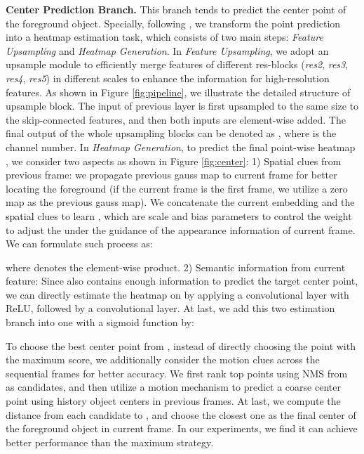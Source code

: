 \documentclass[letterpaper]{article} \usepackage{aaai20}  \usepackage{times}  \usepackage{helvet} \usepackage{courier}  \usepackage[hyphens]{url}  \usepackage{graphicx} \urlstyle{rm} \def\UrlFont{\rm}  \usepackage{graphicx}  \frenchspacing  \setlength{\pdfpagewidth}{8.5in}  \setlength{\pdfpageheight}{11in}  \usepackage{amssymb}
\newcommand{\ldz}[1]{\textcolor{black}{#1}}
\begin{document}
\noindent \textbf{Center Prediction Branch.}
This branch tends to predict the center point of the foreground object. Specially, following \cite{tompson2014joint}, we transform the point prediction into a heatmap  estimation task, which consists of two main steps: \textit{Feature Upsampling} and \textit{Heatmap Generation}.
In \textit{Feature Upsampling}, we adopt an upsample module to efficiently merge features of different res-blocks (\textit{res2}, \textit{res3}, \textit{res4}, \textit{res5}) in different scales to enhance the information for high-resolution features. 
As shown in Figure \ref{fig:pipeline}, we illustrate the detailed structure of upsample block. The input of previous layer is first upsampled to the same size to the skip-connected features, and then both inputs are element-wise added. The final output of the whole upsampling blocks can be denoted as , where  is the channel number. In \textit{Heatmap Generation}, to predict the final point-wise heatmap , we consider two aspects as shown in Figure \ref{fig:center}: 1) \ldz{Spatial} clues from previous frame: we propagate previous gauss map  to current frame for better locating the foreground
(if the current frame is the first frame, we utilize a zero map as the previous gauss map). We concatenate the current embedding  and the \ldz{spatial} clues  to learn , which are scale and bias parameters \ldz{\cite{yang2018efficient}} to control the weight to adjust the  under the guidance of the appearance information of current frame.
We can formulate such process as:



where  denotes the element-wise product. 2) Semantic information from current feature: Since  also contains enough information to predict the target center point, we can directly estimate the heatmap  on  by applying a  convolutional layer with ReLU, followed by a  convolutional layer. 
At last, we add this two estimation branch into one with a sigmoid function by:


To choose the best center point  from , instead of directly choosing the point with the maximum score, we additionally consider the motion clues across the sequential frames for better accuracy. We first rank top  points using NMS \cite{lin2017focal} from  as candidates, and then utilize a motion mechanism \cite{xu2019mhp} to predict a coarse center point  using  history object centers in previous frames. At last, we compute the distance from each candidate to , and choose the closest one as the final center  of the foreground object in current frame. In our experiments, we find it can achieve better performance than the maximum strategy. 
\end{document}
